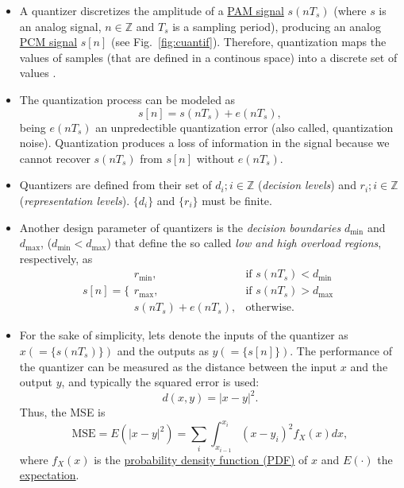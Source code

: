 \begin{itemize}
\tightlist

\item
  A quantizer discretizes the amplitude of a
  \href{https://en.wikipedia.org/wiki/Pulse-amplitude_modulation}{PAM
    signal} \(s(nT_s)\) (where $s$ is an analog signal,
  $n\in{\mathbb{Z}}$ and $T_s$ is a sampling period), producing an
  analog
  \href{https://en.wikipedia.org/wiki/Pulse-code_modulation}{PCM
    signal} $s[n]$ (see Fig.~\ref{fig:cuantif}). Therefore,
  quantization maps the values of samples (that are defined in a
  continous space) into a discrete set of values
  \cite{vetterli1995wavelets}.

\item
  The quantization process can be modeled as
  \begin{equation}
    s[n] = s(nT_s) + e(nT_s),
  \end{equation}
  being \(e(nT_s)\) an unpredectible quantization error (also called,
  quantization noise). Quantization produces a loss of information in
  the signal because we cannot recover $s(nT_s)$ from $s[n]$ without
  $e(nT_s)$.

\item
  Quantizers are defined from their set of \(d_i; i\in {\mathbb{Z}}\)
  (\emph{decision levels}) and \(r_i; i\in {\mathbb{Z}}\)
  (\emph{representation levels}). $\{d_i\}$ and $\{r_i\}$ must be
  finite.

\item Another design parameter of quantizers is the
  \emph{decision boundaries} $d_{\text{min}}$ and $d_{\text{max}}$,
  ($d_{\text{min}}<d_{\text{max}}$) that define the so called \emph{low
    and high overload regions}, respectively, as
  \begin{equation}
    s[n] = \{\begin{array}{ll}
    r_{\text{min}}, & \text{if $s(nT_s)<d_{\text{min}}$} \\
    r_{\text{max}}, & \text{if $s(nT_s)>d_{\text{max}}$} \\
    s(nT_s)+e(nT_s), & \text{otherwise}.
    \end{array}
  \end{equation}
  
\item For the sake of simplicity, lets denote the inputs of the
  quantizer as $x (=\{s(nT_s)\})$ and the outputs as $y
  (=\{s[n]\})$. The performance of the quantizer can be measured as the
  distance between the input $x$ and the output $y$, and typically the
  squared error is used:
  \begin{equation*}
    d(x,y) = |x-y|^2.
  \end{equation*}
  Thus, the MSE is
  \begin{equation}
    \text{MSE} = E(|x-y|^2)=\sum_i\int_{x_{i-1}}^{x_i} (x-y_i)^2f_X(x)dx,
  \end{equation}
  where $f_X(x)$ is the
  \href{https://en.wikipedia.org/wiki/Probability_density_function}{probability
    density function (PDF)} of $x$ and $E(\cdot)$ the
  \href{https://en.wikipedia.org/wiki/Expected_value}{expectation}.

\end{itemize}

